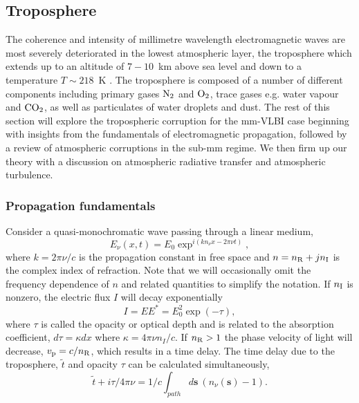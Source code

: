 \subsection{Troposphere}\label{sec:trop}

The coherence and intensity of millimetre wavelength electromagnetic waves are most severely deteriorated in the lowest atmospheric layer, the troposphere which extends up to an altitude of $7-10$~km above sea level and down to a temperature $T \sim 218$~K \citep{Thompson_2001}. The troposphere is composed of a number of different components including primary gases $\rm N_2$ and  $\rm O_2$, trace gases e.g. water vapour and ${\rm CO_2}$, as well as particulates of water droplets and dust. The rest of this section will explore the tropospheric corruption for the mm-VLBI case beginning with insights from the fundamentals of electromagnetic propagation, followed by a review of atmospheric corruptions in the sub-mm regime. We then firm up our theory with a discussion on atmospheric radiative transfer and atmospheric turbulence. 


\subsubsection{Propagation fundamentals}\label{sec:prop_fund}
Consider a quasi-monochromatic wave passing through a linear medium,
\begin{equation}
E_\nu(x,t) = E_0 \exp^{i(kn_\nu x - 2\pi\nu t)},
\end{equation}		
where $k=2\pi \nu/c$ is the propagation constant in free space and $n= n_{\rm R} + j n_{\rm I}$ is the complex index of refraction. Note that we will occasionally omit the frequency dependence of $n$ and related quantities to simplify the notation. If $n_{\rm I}$ is nonzero, the electric flux $I$ will decay exponentially
\begin{equation}
I = EE^\ast = E_0^2 \exp(-\tau),
\end{equation}
where $\tau$ is called the opacity or optical depth and is related to the absorption coefficient, $d\tau = \kappa dx$ where $\kappa = 4\pi \nu n_I/c$. If $n_{\rm R} > 1 $ the phase velocity of light will decrease, $v_{\rm p} = c/n_{\rm R}$, which results in a time delay. The time delay due to the troposphere, $\tilde{t}$ and opacity $\tau$ can be calculated simultaneously,
\begin{equation}\label{timedelay}
\tilde{t} + i \tau /4\pi \nu =1/c \int_{path} d\bm{s}\  (n_\nu(\bm{s}) -1).
\end{equation}

